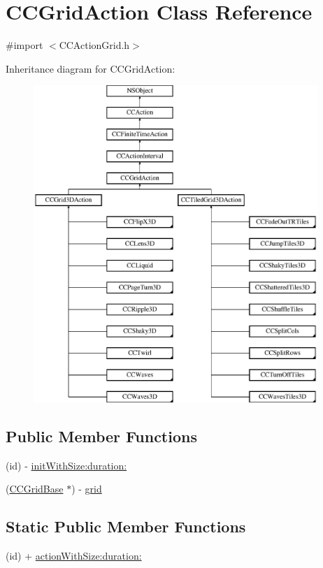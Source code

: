 \hypertarget{interface_c_c_grid_action}{\section{C\-C\-Grid\-Action Class Reference}
\label{interface_c_c_grid_action}
}


{\ttfamily \#import $<$C\-C\-Action\-Grid.\-h$>$}

Inheritance diagram for C\-C\-Grid\-Action\-:\begin{figure}[H]
\begin{center}
\leavevmode
\includegraphics[height=12.000000cm]{interface_c_c_grid_action}
\end{center}
\end{figure}
\subsection*{Public Member Functions}
\begin{DoxyCompactItemize}
\item 
(id) -\/ \hyperlink{interface_c_c_grid_action_ae78d21251efbc9f3098266468311a0aa}{init\-With\-Size\-:duration\-:}
\item 
(\hyperlink{interface_c_c_grid_base}{C\-C\-Grid\-Base} $\ast$) -\/ \hyperlink{interface_c_c_grid_action_a473b261d16d711af079ec64f8b25675a}{grid}
\end{DoxyCompactItemize}
\subsection*{Static Public Member Functions}
\begin{DoxyCompactItemize}
\item 
(id) + \hyperlink{interface_c_c_grid_action_a1e5a3442b182c00a675cdd3d377f9f1b}{action\-With\-Size\-:duration\-:}
\end{DoxyCompactItemize}
